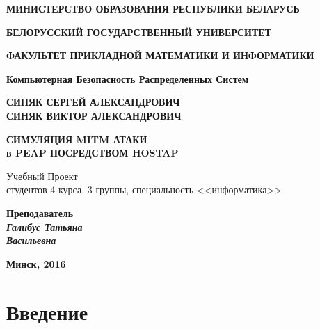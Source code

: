 \documentclass[oneside, final, 14pt]{extarticle}
\begin{document}
\begin{titlepage}


\centerline{\bf МИНИСТЕРСТВО ОБРАЗОВАНИЯ РЕСПУБЛИКИ БЕЛАРУСЬ}
\bigskip
\bigskip
\centerline{\bf БЕЛОРУССКИЙ ГОСУДАРСТВЕННЫЙ УНИВЕРСИТЕТ}
\bigskip
\bigskip
\centerline{\bf ФАКУЛЬТЕТ ПРИКЛАДНОЙ МАТЕМАТИКИ И ИНФОРМАТИКИ}
\bigskip
\bigskip
\centerline{\bf Компьютерная Безопасность Распределенных Систем}
\vfill
\vfill
\vfill
\begin{centering}
  {\bf СИНЯК СЕРГЕЙ АЛЕКСАНДРОВИЧ \\
       СИНЯК ВИКТОР АЛЕКСАНДРОВИЧ \\}
\end{centering}
\bigskip
\bigskip
\begin{centering}
  {\bf СИМУЛЯЦИЯ MITM АТАКИ \\
       в PEAP ПОСРЕДСТВОМ HOSTAP \\}
\end{centering}
\vfill
\begin{centering}
  {
  Учебный Проект \\
  студентов 4 курса, 3 группы, специальность <<информатика>> \\}
\end{centering}
\vfill
\vfill
\hfill
\begin{minipage}{0.35\textwidth}
  {\bf Преподаватель \\
  {\small{\it Галибус Татьяна \\ Васильевна}}}
\end{minipage}
\vfill
\vfill
\centerline{\large \bf Минск, 2016}

\restoregeometry

\end{titlepage}

\setcounter{page}{2}

\tableofcontents

\cleardoublepage

\section{Введение}
\end{document}
